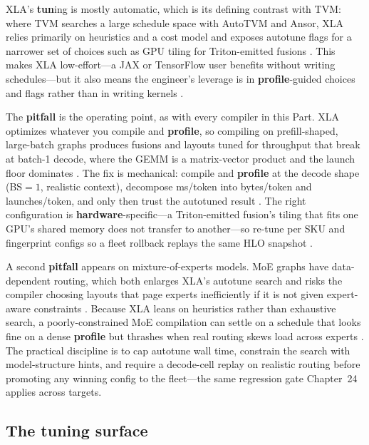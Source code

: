 XLA's \textbf{tun}ing is mostly automatic, which is its defining contrast with TVM: where TVM searches a large schedule space with AutoTVM and Ansor, XLA relies primarily on heuristics and a cost model and exposes autotune flags for a narrower set of choices such as GPU tiling for Triton-emitted fusions \citep{openxla2024,chen2018tvm}. This makes XLA low-effort---a JAX or TensorFlow user benefits without writing schedules---but it also means the engineer's leverage is in \textbf{profile}-guided choices and flags rather than in writing kernels \citep{openxla2024,patel2025llminference}.

The \textbf{pitfall} is the operating point, as with every compiler in this Part. XLA optimizes whatever you compile and \textbf{profile}, so compiling on prefill-shaped, large-batch graphs produces fusions and layouts tuned for throughput that break at batch-1 decode, where the GEMM is a matrix-vector product and the launch floor dominates \citep{kwon2023vllm,taxbreak2026}. The fix is mechanical: compile and \textbf{profile} at the decode shape (BS${=}1$, realistic context), decompose ms/token into bytes/token and launches/token, and only then trust the autotuned result \citep{patel2025llminference,memoryfloor2026}. The right configuration is \textbf{hardware}-specific---a Triton-emitted fusion's tiling that fits one GPU's shared memory does not transfer to another---so re-tune per SKU and fingerprint configs so a fleet rollback replays the same HLO snapshot \citep{nvidia2022hopper,openxla2024}.

A second \textbf{pitfall} appears on mixture-of-experts models. MoE graphs have data-dependent routing, which both enlarges XLA's autotune search and risks the compiler choosing layouts that page experts inefficiently if it is not given expert-aware constraints \citep{liu2024deepseekv3,patel2025llminference}. Because XLA leans on heuristics rather than exhaustive search, a poorly-constrained MoE compilation can settle on a schedule that looks fine on a dense \textbf{profile} but thrashes when real routing skews load across experts \citep{kwon2023vllm,taxbreak2026}. The practical discipline is to cap autotune wall time, constrain the search with model-structure hints, and require a decode-cell replay on realistic routing before promoting any winning config to the fleet---the same regression gate Chapter~24 applies across targets.

\subsection{The tuning surface}


